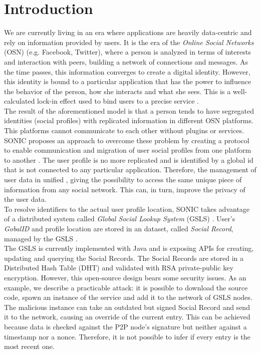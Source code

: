 \section{Introduction}
\label{S:1}

We are currently living in an era where applications are heavily data-centric and rely on information provided by users. It is the era of the \textit{Online Social Networks} (OSN) \cite{gondor_sonic:_2014} (e.g. Facebook, Twitter), where a person is analyzed in terms of interests and interaction with peers, building a network of connections and messages. As the time passes, this information converges to create a digital identity. However, this identity is bound to a particular application that has the power to influence the behavior of the person, how she interacts and what she sees. This is a well-calculated lock-in effect used to bind users to a precise service \cite{gondor_distributed_2016}. 
\\

The result of the aforementioned model is that a person tends to have segregated identities (social profiles) with replicated information in different OSN platforms. This platforms cannot communicate to each other without plugins or services. SONIC proposes an approach to overcome these problem by creating a protocol to enable communication and migration of user social profiles from one platform to another \cite{gondor_sonic:_2014}. The user profile is no more replicated and is identified by a global id that is not connected to any particular application. Therefore, the management of user data in unified \cite{identity_mgmt_2003}, giving the possibility to access the same unique piece of information from any social network. This can, in turn, improve the privacy of the user data. 
\\

To resolve identifiers to the actual user profile location, SONIC takes advantage of a distributed system called \textit{Global Social Lookup System} (GSLS) \cite{gondor_distributed_2016}. User's \textit{GobalID} and profile location are stored in an dataset, called \textit{Social Record}, managed by the GSLS \cite{gondor_distributed_2016}.
\\

The GSLS is currently implemented with Java and is exposing APIs for creating, updating and querying the Social Records. The Social Records are stored in a Distributed Hash Table \cite{tomp2p_2009} (DHT) and validated with RSA private-public key encryption. However, this open-source design bears some security issues. As an example, we describe a practicable attack: it is possible to download the source code, spawn an instance of the service and add it to the network of GSLS nodes. The malicious instance can take an outdated but signed Social Record and send it to the network, causing an override of the current entry. This can be achieved because data is checked against the P2P node's signature but neither against a timestamp nor a nonce. Therefore, it is not possible to infer if every entry is the most recent one. 
\\

